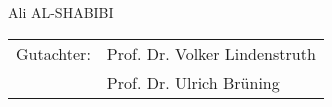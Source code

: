 \begin{titlepage}
\begin{center}
    \vfill





    \begin{large}

      \vspace{1.0cm}
      Ali AL-SHABIBI\\
      \vfill
\begin{tabular}{cl}
   	  Gutachter: & Prof. Dr. Volker Lindenstruth \\
   	  		   & Prof. Dr. Ulrich Br\"uning
\end{tabular}
    \end{large}

  \end{center}

\newpage
\mbox{}


%
%
%
%
%
%
%
%
%
%
%  
%  
%
%
%
%
%
%
%
  
\end{titlepage}


